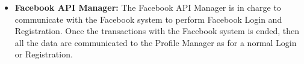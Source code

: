 \documentclass[../../../../../../dd.tex]{subfiles}
\begin{document}
\begin{itemize}
			\item \textbf{Facebook API Manager:} The Facebook API Manager is in charge to communicate with the Facebook system to perform Facebook Login and Registration. Once the transactions with the Facebook system is ended, then all the data are communicated to the Profile Manager as for a normal Login or Registration.
			
		\end{itemize}
	
\end{document}
